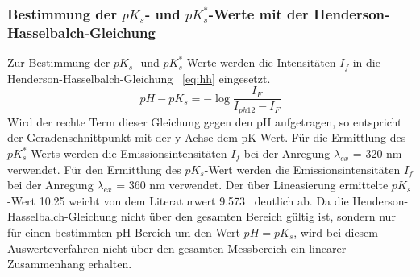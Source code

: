 \documentclass[12pt]{article}
\begin{document}
\subsubsection{Bestimmung der $pK_s$- und $pK_s^*$-Werte mit der Henderson-Hasselbalch-Gleichung }
Zur Bestimmung der $pK_s$- und $pK_s^*$-Werte werden die Intensitäten $I_f$ in die Henderson-Hasselbalch-Gleichung ~\ref{eq:hh} eingesetzt. 
\begin{equation}
  \label{eq:hh}
  pH-pK_s = -\log\frac{I_F}{I_{ph12}-I_F} 
\end{equation}
Wird der rechte Term dieser Gleichung gegen den pH aufgetragen, so entspricht der Geradenschnittpunkt
mit der y-Achse dem pK-Wert. 
Für die Ermittlung des $pK_s^*$-Werts werden die Emissionsintensitäten $I _f$  bei der Anregung $\lambda _{ex}$ = 320 \si{\nano\meter} verwendet. 
Für den Ermittlung des $pK_s$-Wert werden die Emissionsintensitäten $I _f$  bei der Anregung  $\lambda _{ex}$ = 360 \si{\nano\meter} verwendet. Der über Lineasierung ermittelte $pK_s$-Wert 10.25 weicht von dem Literaturwert 9.573~\supercite{harris} deutlich ab. Da die Henderson-Hasselbalch-Gleichung nicht über den gesamten Bereich gültig ist, sondern nur für einen bestimmten pH-Bereich um den Wert $pH = pK_s$, wird bei diesem Auswerteverfahren
nicht über den gesamten Messbereich ein linearer Zusammenhang erhalten. 
\end{document}
